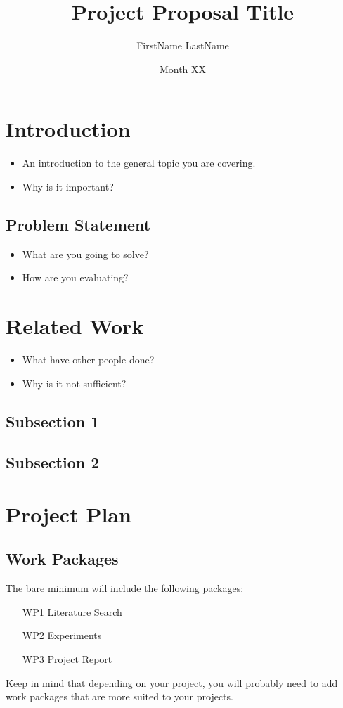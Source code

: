 \documentclass[rnd]{mas_proposal}
\title{Project Proposal Title}
\author{FirstName LastName}
\date{Month XX}
\begin{document}
\maketitle

\pagestyle{plain}

\section{Introduction}
\begin{itemize}
    \item An introduction to the general topic you are covering.
    \item Why is it important?
\end{itemize}

\subsection{Problem Statement}
\begin{itemize}
    \item What are you going to solve?
    \item How are you evaluating?
\end{itemize}


\section{Related Work}
\begin{itemize}
    \item What have other people done?
    \item Why is it not sufficient?
\end{itemize}

\subsection{Subsection 1}
\subsection{Subsection 2}



\section{Project Plan}

\subsection{Work Packages}
The bare minimum will include the following packages:
\begin{enumerate}
    \item[WP1] Literature Search
    \item[WP2] Experiments
    \item[WP3] Project Report
\end{enumerate}
Keep in mind that depending on your project, you will probably need to add work packages that are more suited to your projects.
\end{document}
